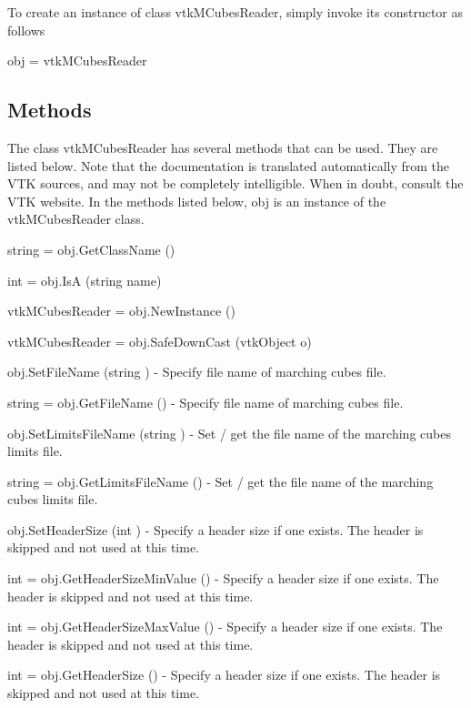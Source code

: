 To create an instance of class vtk\-M\-Cubes\-Reader, simply invoke its constructor as follows \begin{DoxyVerb}  obj = vtkMCubesReader
\end{DoxyVerb}
 \hypertarget{vtkwidgets_vtkxyplotwidget_Methods}{}\subsection{Methods}\label{vtkwidgets_vtkxyplotwidget_Methods}
The class vtk\-M\-Cubes\-Reader has several methods that can be used. They are listed below. Note that the documentation is translated automatically from the V\-T\-K sources, and may not be completely intelligible. When in doubt, consult the V\-T\-K website. In the methods listed below, {\ttfamily obj} is an instance of the vtk\-M\-Cubes\-Reader class. 
\begin{DoxyItemize}
\item {\ttfamily string = obj.\-Get\-Class\-Name ()}  
\item {\ttfamily int = obj.\-Is\-A (string name)}  
\item {\ttfamily vtk\-M\-Cubes\-Reader = obj.\-New\-Instance ()}  
\item {\ttfamily vtk\-M\-Cubes\-Reader = obj.\-Safe\-Down\-Cast (vtk\-Object o)}  
\item {\ttfamily obj.\-Set\-File\-Name (string )} -\/ Specify file name of marching cubes file.  
\item {\ttfamily string = obj.\-Get\-File\-Name ()} -\/ Specify file name of marching cubes file.  
\item {\ttfamily obj.\-Set\-Limits\-File\-Name (string )} -\/ Set / get the file name of the marching cubes limits file.  
\item {\ttfamily string = obj.\-Get\-Limits\-File\-Name ()} -\/ Set / get the file name of the marching cubes limits file.  
\item {\ttfamily obj.\-Set\-Header\-Size (int )} -\/ Specify a header size if one exists. The header is skipped and not used at this time.  
\item {\ttfamily int = obj.\-Get\-Header\-Size\-Min\-Value ()} -\/ Specify a header size if one exists. The header is skipped and not used at this time.  
\item {\ttfamily int = obj.\-Get\-Header\-Size\-Max\-Value ()} -\/ Specify a header size if one exists. The header is skipped and not used at this time.  
\item {\ttfamily int = obj.\-Get\-Header\-Size ()} -\/ Specify a header size if one exists. The header is skipped and not used at this time.  

\end{DoxyItemize}
